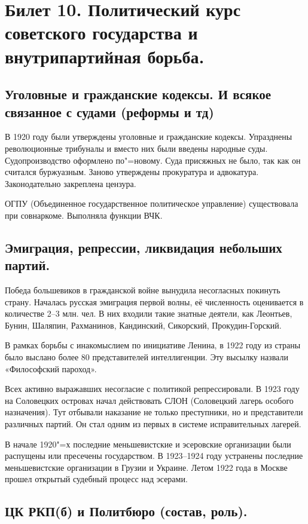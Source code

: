 \section{Билет 10. Политический курс советского государства и внутрипартийная борьба.}

\subsection{Уголовные и гражданские кодексы. И всякое связанное с судами (реформы и тд)}

В 1920 году были утверждены уголовные и гражданские кодексы. Упразднены революционные трибуналы и вместо них были введены народные суды. Судопроизводство оформлено по"=новому. Суда присяжных не было, так как он считался буржуазным. Заново утверждены прокуратура и адвокатура. Законодательно закреплена цензура. 

ОГПУ (Объединенное государственное политическое управление) существовала при совнаркоме. Выполняла функции ВЧК.

\subsection{Эмиграция, репрессии, ликвидация небольших партий.}

Победа большевиков в гражданской войне вынудила несогласных покинуть страну. Началась русская эмиграция первой волны, её численность оценивается в количестве 2--3 млн. чел. В них входили такие знатные деятели, как Леонтьев, Бунин, Шаляпин, Рахманинов, Кандинский, Сикорский, Прокудин-Горский.

В рамках борьбы с инакомыслием по инициативе Ленина, в 1922 году из страны было выслано более 80 представителей интеллигенции. Эту высылку назвали «Философский пароход».

Всех активно выражавших несогласие с политикой репрессировали. В 1923 году на Соловецких островах начал действовать СЛОН (Соловецкий лагерь особого назначения). Тут отбывали наказание не только преступники, но и представители различных партий. Он стал одним из первых в системе исправительных лагерей.

В начале 1920"=х последние меньшевистские и эсеровские организации были распущены или пресечены государством. В 1923--1924 году устранены последние меньшевистские организации в Грузии и Украине. Летом 1922 года в Москве прошел открытый судебный процесс над эсерами. 

\subsection{ЦК РКП(б) и Политбюро (состав, роль).}

